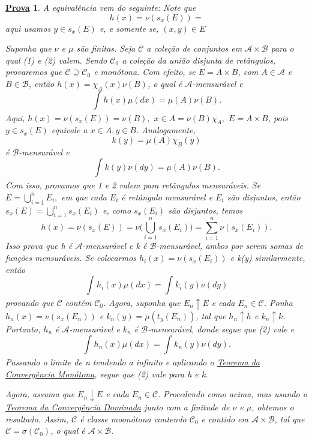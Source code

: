 \documentclass{article}
\newtheorem*{proof*}{\underline{Prova}}
\begin{document}
 \begin{proof*}
   A equivalência vem do seguinte: Note que 
     \[
       h(x) = \nu(s_x(E)) =
     \]
     aqui usamos \(y\in s_x(E)\) e, e somente se, \((x, y)\in E\) 

    Suponha que \(\nu\) e \(\mu \) são finitas. Seja \(\mathcal{C}\) a coleção de conjuntos em \(\mathcal{A}\times \mathcal{B}\) para o qual (1)
  e (2) valem. Sendo \(\mathcal{C}_{0}\) a coleção da união disjunta de retângulos, provaremos que \(\mathcal{C}\supseteq \mathcal{C}_{0}\) e monótona. 
  Com efeito, se \(E = A\times B\), com \(A\in \mathcal{A}\) e \(B\in \mathcal{B}\), então \(h(x) = \chi_{A}(x)\nu(B)\), o qual é \(\mathcal{A}\)-mensurável e 
    \[
      \int_{}h(x) \mu (dx) = \mu (A)\nu(B).
    \]
  Aqui, \(h(x) = \nu(s_x(E)) = \nu(B),\) \(x\in A = \nu(B)\chi_{A},\) \(E = A\times B\), pois \(y\in s_x(E) \) equivale a \(x\in  A, y\in B\). Analogamente, 
    \[
      k(y) = \mu (A)\chi_{B}(y)
    \]
  é \(\mathcal{B}\)-mensurável e 
    \[
      \int_{}k(y)\nu( dy) = \mu (A)\nu(B).
    \]
  Com isso, provamos que 1 e 2 valem para retângulos mensuráveis. Se \(E = \bigcup_{i=1}^{n}E_{i},\) em que cada \(E_{i}\) é retângulo mensurável e \(E_{i}\) são disjuntos, então \(s_x(E) = \bigcup_{i=1}^{n}s_x(E_{i})\)
e, como \(s_x(E_{i})\) são disjuntos, temos 
  \[
    h(x) = \nu(s_x(E)) = \nu \biggl(\bigcup_{i=1}^{n}s_x(E_{i})\biggr) = \sum\limits_{i=1}^{n}\nu(s_x(E_{i})).
  \]
  Isso prova que h é \(\mathcal{A}\)-mensurável e k é \(\mathcal{B}\)-mensurável, ambos por serem somas de funções mensuráveis. Se colocarmos \(h_{i}(x) = \nu(s_x(E_{i}))\) e k(y) similarmente, então 
    \[
      \int_{}h_{i}(x)\mu ( dx) = \int_{}k_{i}(y)\nu( dy)
    \]
  provando que \(\mathcal{C}\) contém \(\mathcal{C}_{0}\). Agora, suponha que \(E_{n}\uparrow E\) e cada \(E_{n}\in \mathcal{C}\). Ponha \(h_{n}(x) = \nu(s_x(E_{n}))\) e \(k_{n}(y) = \mu (t_y(E_{n}))\), tal que 
  \(h_{n}\uparrow h\) e \(k_{n}\uparrow k\). Portanto, \(h_{n}\) é \(\mathcal{A}\)-mensurável e \(k_{n}\) é \(\mathcal{B}\)-mensurável, donde segue que (2) vale e 
    \[
      \int_{}h_{n}(x)\mu ( dx) = \int_{}k_{n}(y)\nu( dy).
    \]
  Passando o limite de n tendendo a infinito e aplicando o \hyperlink{monotone_convergence}{Teorema da Convergência Monótona}, segue que (2) vale para h e k. 

  Agora, assuma que \(E_{n}\downarrow E\) e cada \(E_{n}\in \mathcal{C}.\) Procedendo como acima, mas usando o \hyperlink{dominated_convergence}{Teorema da Convergência Dominada} junto com a finitude de \(\nu\) e \(\mu \), obtemos o resultado. 
Assim, \(\mathcal{C}\) é classe moonótona contendo \(\mathcal{C}_{0}\) e contido em \(\mathcal{A}\times \mathcal{B}\), tal que \(\mathcal{C} = \sigma (\mathcal{C}_{0})\), o qual é \(\mathcal{A}\times \mathcal{B}.\)


\end{proof*}
\end{document}
